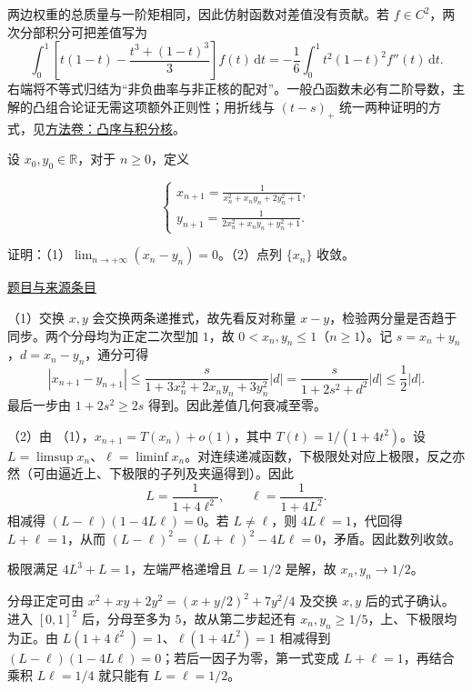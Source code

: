 \documentclass[UTF8,12pt,a4paper,fontset=fandol]{ctexart}
\begin{document}
\begin{remark}[方法与条件]两边权重的总质量与一阶矩相同，因此仿射函数对差值没有贡献。若 $f\in C^2$，两次分部积分可把差值写为
\[
\int_0^1\left[t(1-t)-\frac{t^3+(1-t)^3}{3}\right]f(t)\,\mathrm dt
=-\frac16\int_0^1t^2(1-t)^2f''(t)\,\mathrm dt.
\]
右端将不等式归结为“非负曲率与非正核的配对”。一般凸函数未必有二阶导数，主解的凸组合论证无需这项额外正则性；用折线与 $(t-s)_+$ 统一两种证明的方式，见\hyperref[app:estimate-convexity]{方法卷：凸序与积分核}。\end{remark}

\begin{example}[来源序号5]\label{ex:ch05-14th-A-makeup:5}\label{pr:ch05-14th-A-makeup:5}

设 $x_0,y_0 \in \mathbb{R}$，对于 $n \geq 0$，定义

\[
\begin{cases}
x_{n+1} = \frac{1}{x_n^2+x_n y_n+2 y_n^2+1}, \\
y_{n+1} = \frac{1}{2 x_n^2+x_n y_n+y_n^2+1}.
\end{cases}
\]

证明：（1）$\lim_{n \to +\infty} \left(x_n-y_n\right) = 0$。（2）点列 $\{x_n\}$ 收敛。

\par\href{https://github.com/lzxcr/cmc-mathematics/blob/64916fa1fdbc3e444a652eca204d5669058ee321/src/problems/preliminary/14-makeup/05.md}{题目与来源条目}

\end{example}

\begin{solve}\label{ans:ch05-14th-A-makeup:5}

（1）交换 $x,y$ 会交换两条递推式，故先看反对称量 $x-y$，检验两分量是否趋于同步。两个分母均为正定二次型加 $1$，故 $0<x_n,y_n\leq1$（$n\geq1$）。记 $s=x_n+y_n$，$d=x_n-y_n$，通分可得
\[
|x_{n+1}-y_{n+1}|
\leq\frac{s}{1+3x_n^2+2x_ny_n+3y_n^2}|d|
=\frac{s}{1+2s^2+d^2}|d|
\leq\frac12|d|.
\]
最后一步由 $1+2s^2\geq2s$ 得到。因此差值几何衰减至零。

（2）由 （1），$x_{n+1}=T(x_n)+o(1)$，其中 $T(t)=1/(1+4t^2)$。设 $L=\limsup x_n$、$\ell=\liminf x_n$。对连续递减函数，下极限处对应上极限，反之亦然（可由逼近上、下极限的子列及夹逼得到）。因此
\[
L=\frac1{1+4\ell^2},\qquad
\ell=\frac1{1+4L^2}.
\]
相减得 $(L-\ell)(1-4L\ell)=0$。若 $L\neq\ell$，则 $4L\ell=1$，代回得 $L+\ell=1$，从而 $(L-\ell)^2=(L+\ell)^2-4L\ell=0$，矛盾。因此数列收敛。

极限满足 $4L^3+L=1$，左端严格递增且 $L=1/2$ 是解，故 $x_n,y_n\to1/2$。

分母正定可由 $x^2+xy+2y^2=(x+y/2)^2+7y^2/4$ 及交换 $x,y$ 后的式子确认。进入 $[0,1]^2$ 后，分母至多为 $5$，故从第二步起还有 $x_n,y_n\ge1/5$，上、下极限均为正。由 $L(1+4\ell^2)=1$、$\ell(1+4L^2)=1$ 相减得到 $(L-\ell)(1-4L\ell)=0$；若后一因子为零，第一式变成 $L+\ell=1$，再结合乘积 $L\ell=1/4$ 就只能有 $L=\ell=1/2$。

\end{solve}
\end{document}

